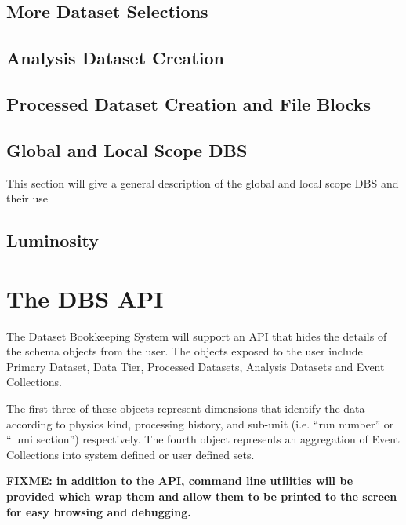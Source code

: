 \documentclass{cmspaper}
\begin{document}
\subsection{More Dataset Selections}
\label{sec:moredataset}

\subsection{Analysis Dataset Creation}
\label{sec:ADcreation}

\subsection{Processed Dataset Creation and File Blocks}
\label{sec:ProcDcreation}

\subsection{Global and Local Scope DBS}
\label{sec:DBSscopes}
  This section will give a general description of the global and local scope
DBS and their use

\subsection{Luminosity}
\label{sec:Luminosity}

\section{The DBS API}

  The Dataset Bookkeeping System will support an API that hides the details of 
the schema objects from the user. The objects exposed to the user include 
Primary Dataset, Data Tier, Processed Datasets, Analysis Datasets and Event 
Collections.  

The first three of these objects represent dimensions that identify the data 
according to physics kind, processing history, and sub-unit (i.e. ``run 
number'' or ``lumi section'') respectively.  The fourth object represents an 
aggregation of Event Collections into system defined or user defined sets.  

  {\bf FIXME: in addition to the API, command line utilities will be provided
which wrap them and allow them to be printed to the screen for easy browsing
and debugging.}
\end{document}
